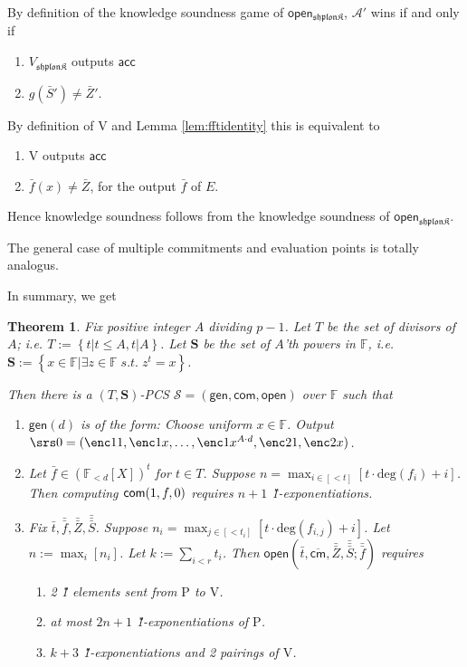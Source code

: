 \documentclass[11pt]{article} %
\newcommand{\F}{\ensuremath{\mathbb F}\xspace}
\newcommand{\advprime}{\ensuremath{{\mathcal A}'}\xspace}
\newcommand{\com}{\ensuremath{\mathsf{com}}\xspace}
\newcommand{\cmm}{\ensuremath{\mathsf{\overline{cm}}}\xspace}
\newcommand{\open}{\ensuremath{\mathsf{open}}\xspace}
\renewcommand{\deg}{\ensuremath{\mathrm{deg}}\xspace}
\newcommand{\acc}{\ensuremath{\mathsf{acc}}\xspace}
\newcommand{\defeq}{:=}
\newcommand{\gen}{\ensuremath{\mathsf{gen}}\xspace}
\newcommand{\prvpc}{\ensuremath{\mathrm{P}}\xspace}%
\newcommand{\verpc}{\ensuremath{\mathrm{V}}\xspace}%
\newcommand{\ext}{\ensuremath{E}\xspace}
\newcommand{\shplonk}{\ensuremath{\mathfrak{sh}\mathfrak{p}\mathfrak{lon}\mathfrak{K}}\xspace}
\newcommand{\vershplonk}{\ensuremath{V_{\shplonk}}\xspace}
\newcommand{\set}[1]{\ensuremath{\left\{#1\right\}}\xspace}
\newcommand{\polyvecs}[2]{\ensuremath{(\F_{< #1}[X])^{#2}}\xspace}
\newcommand{\PCscheme}{\ensuremath{\mathscr{S}}\xspace}
\newtheorem{thm}[lemma]{Theorem}
\newcommand{\Z}{\mathbb{Z}}
\newcommand{\openset}{\ensuremath{\mathbf{S}}\xspace}
\newcommand{\lt}[1]{\ensuremath{ [ {\scriptscriptstyle <} #1]}\xspace}
\newcommand{\f}{\ensuremath{\bar{f}}\xspace}
\renewcommand{\t}{\ensuremath{\bar{t}}\xspace}
\newcommand{\ff}{\ensuremath{\bar{\bar{f}}}\xspace}
\renewcommand{\S}{\ensuremath{\bar{S}}\xspace}
\renewcommand{\Z}{\ensuremath{\bar{Z}}\xspace}
\newcommand{\ZZ}{\ensuremath{\bar{\bar{Z}}}\xspace}
\newcommand{\SSS}{\ensuremath{\bar{\bar{\bar{S}}}}\xspace}
\newcommand{\sumi}[1]{\sum_{i<#1}}
\newcommand{\openshplonk}{\ensuremath{\mathsf{open_{\shplonk}}}\xspace}
\begin{document}
By definition of the knowledge soundness game of \openshplonk, \advprime wins if and only if 
\begin{enumerate}
 \item \vershplonk outputs \acc 
 \item $g(\S')\neq \Z'$. 
\end{enumerate}
By definition of \verpc and Lemma \ref{lem:fftidentity} this is equivalent to 
\begin{enumerate}
 \item \verpc outputs \acc
 \item $\f(x)\neq \Z$, for the output \f of \ext.
\end{enumerate}
Hence knowledge soundness follows from the knowledge soundness of \openshplonk.

The general case of multiple commitments and evaluation points is totally analogus.


 
 
 
 
 
 
 In summary, we get
\begin{thm}\label{thm:newPCS}
 Fix positive integer $A$ dividing $p-1$. Let $T$ be the set of divisors of $A$; i.e. $T\defeq \set{t| t\leq A,t|A}$.
 Let \openset be the set of $A$'th powers in \F, i.e. $\openset \defeq \set{x\in \F| \exists z\in \F \;s.t.\; z^t=x}$.
 
Then there is a $(T,\openset)$-PCS $\PCscheme=(\gen,\com,\open)$ over \F  such that
  \begin{enumerate}
  \item $\gen(d)$ is of the form: Choose uniform $x\in \F$. Output $\srs0 =(\enc1{1},\enc1{x},\ldots,\enc1{x^{A\cdot d}},\enc2{1},\enc2{x})$.
  \item Let $\f\in \polyvecs{d}{t}$ for $t\in T$. Suppose $n=\max_{i\in\lt{t}} [t\cdot \deg(f_i)+i] $. Then computing $\com(1,f,\srs0)$ requires $n+1$ \G1-exponentiations.
   \item Fix $\t, \ff,\ZZ,\SSS$. Suppose $n_i=\max_{j\in\lt{t_i}} \left[t\cdot \deg(f_{i,j})+i\right] $. Let $n\defeq \max_{i} \left[n_i\right]$.
   Let $k\defeq \sumi{r}t_i$.
   Then $\open\left(\t,\cmm,\ZZ,\SSS;\ff\right)$ requires

    \begin{enumerate}
    \item 2 \G1 elements sent from \prvpc to \verpc.
    \item at most $2n+1$ \G1-exponentiations of \prvpc.
    \item $k+3$ \G1-exponentiations and 2 pairings of \verpc.
\end{enumerate}
\end{enumerate}

\end{thm}
 
\end{document}
